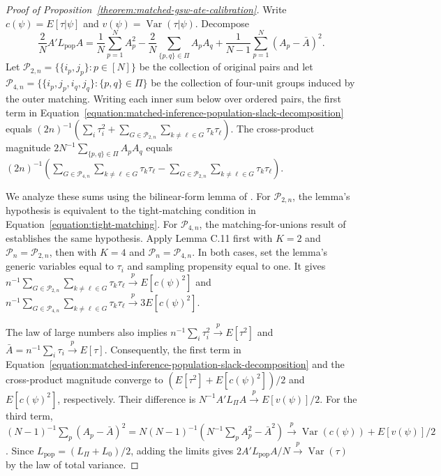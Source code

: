 \documentclass[letterpaper,12pt]{article}
\theoremstyle{definition}
\numberwithin{equation}{section}
\newcommand{\convp}{\overset{p}{\to}}
\newcommand{\E}{E}
\DeclareMathOperator{\var}{Var}
\begin{document}
\begin{proof}[Proof of Proposition~\ref{theorem:matched-gsw-ate-calibration}]
Write $c(\psi)=\E[\tau|\psi]$ and $v(\psi)=\var(\tau|\psi)$.
Decompose
\begin{equation}\label{equation:matched-inference-population-slack-decomposition}
\frac2NA'L_{\mathrm{pop}}A=\frac1N\sum_{p=1}^NA_p^2-\frac2N\sum_{\{p,q\}\in\Pi}A_pA_q+\frac1{N-1}\sum_{p=1}^N(A_p-\bar A)^2.
\end{equation}
Let $\mathcal P_{2,n}=\{\{i_p,j_p\}:p\in[N]\}$ be the collection of original pairs and let $\mathcal P_{4,n}=\{\{i_p,j_p,i_q,j_q\}:\{p,q\}\in\Pi\}$ be the collection of four-unit groups induced by the outer matching.
Writing each inner sum below over ordered pairs, the first term in Equation~\eqref{equation:matched-inference-population-slack-decomposition} equals $(2n)^{-1}(\sum_i\tau_i^2+\sum_{G\in\mathcal P_{2,n}}\sum_{k\neq\ell\in G}\tau_k\tau_\ell)$.
The cross-product magnitude $2N^{-1}\sum_{\{p,q\}\in\Pi}A_pA_q$ equals $(2n)^{-1}(\sum_{G\in\mathcal P_{4,n}}\sum_{k\neq\ell\in G}\tau_k\tau_\ell-\sum_{G\in\mathcal P_{2,n}}\sum_{k\neq\ell\in G}\tau_k\tau_\ell)$.

We analyze these sums using the bilinear-form lemma of \citet[Lemma C.11]{cytrynbaum2022local}.
For $\mathcal P_{2,n}$, the lemma's hypothesis is equivalent to the tight-matching condition in Equation~\eqref{equation:tight-matching}.
For $\mathcal P_{4,n}$, the matching-for-unions result of \citet[Lemma D.23]{cytrynbaum2022local} establishes the same hypothesis.
Apply Lemma C.11 first with $K=2$ and $\mathcal P_n=\mathcal P_{2,n}$, then with $K=4$ and $\mathcal P_n=\mathcal P_{4,n}$.
In both cases, set the lemma's generic variables equal to $\tau_i$ and sampling propensity equal to one.
It gives $n^{-1}\sum_{G\in\mathcal P_{2,n}}\sum_{k\neq\ell\in G}\tau_k\tau_\ell\convp\E[c(\psi)^2]$ and $n^{-1}\sum_{G\in\mathcal P_{4,n}}\sum_{k\neq\ell\in G}\tau_k\tau_\ell\convp 3\E[c(\psi)^2]$.

The law of large numbers also implies $n^{-1}\sum_i\tau_i^2\convp\E[\tau^2]$ and $\bar A=n^{-1}\sum_i\tau_i\convp\E[\tau]$.
Consequently, the first term in Equation~\eqref{equation:matched-inference-population-slack-decomposition} and the cross-product magnitude converge to $(\E[\tau^2]+\E[c(\psi)^2])/2$ and $\E[c(\psi)^2]$, respectively.
Their difference is $N^{-1}A'L_\Pi A\convp\E[v(\psi)]/2$.
For the third term, $(N-1)^{-1}\sum_p(A_p-\bar A)^2=N(N-1)^{-1}(N^{-1}\sum_pA_p^2-\bar A^2)\convp\var(c(\psi))+\E[v(\psi)]/2$.
Since $L_{\mathrm{pop}}=(L_\Pi+L_0)/2$, adding the limits gives $2A'L_{\mathrm{pop}}A/N\convp\var(\tau)$ by the law of total variance.
\end{proof}
\end{document}
